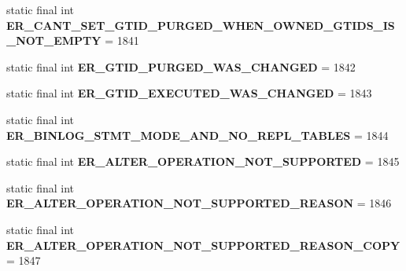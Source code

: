 \begin{DoxyCompactItemize}
static final int {\bfseries E\+R\+\_\+\+C\+A\+N\+T\+\_\+\+S\+E\+T\+\_\+\+G\+T\+I\+D\+\_\+\+P\+U\+R\+G\+E\+D\+\_\+\+W\+H\+E\+N\+\_\+\+O\+W\+N\+E\+D\+\_\+\+G\+T\+I\+D\+S\+\_\+\+I\+S\+\_\+\+N\+O\+T\+\_\+\+E\+M\+P\+TY} = 1841
\item 
\mbox{\label{classcom_1_1mysql_1_1jdbc_1_1_mysql_error_numbers_a2bfc7fcef223745f9eaf66b9d0e5ae52}} 
static final int {\bfseries E\+R\+\_\+\+G\+T\+I\+D\+\_\+\+P\+U\+R\+G\+E\+D\+\_\+\+W\+A\+S\+\_\+\+C\+H\+A\+N\+G\+ED} = 1842
\item 
\mbox{\label{classcom_1_1mysql_1_1jdbc_1_1_mysql_error_numbers_a84cf16acdaceffc21025fd64c349d2f3}} 
static final int {\bfseries E\+R\+\_\+\+G\+T\+I\+D\+\_\+\+E\+X\+E\+C\+U\+T\+E\+D\+\_\+\+W\+A\+S\+\_\+\+C\+H\+A\+N\+G\+ED} = 1843
\item 
\mbox{\label{classcom_1_1mysql_1_1jdbc_1_1_mysql_error_numbers_a7f3026c2abec01c0d70b4cdb81c17c56}} 
static final int {\bfseries E\+R\+\_\+\+B\+I\+N\+L\+O\+G\+\_\+\+S\+T\+M\+T\+\_\+\+M\+O\+D\+E\+\_\+\+A\+N\+D\+\_\+\+N\+O\+\_\+\+R\+E\+P\+L\+\_\+\+T\+A\+B\+L\+ES} = 1844
\item 
\mbox{\label{classcom_1_1mysql_1_1jdbc_1_1_mysql_error_numbers_a0dfd1375973192bf9aec4c7558c037f6}} 
static final int {\bfseries E\+R\+\_\+\+A\+L\+T\+E\+R\+\_\+\+O\+P\+E\+R\+A\+T\+I\+O\+N\+\_\+\+N\+O\+T\+\_\+\+S\+U\+P\+P\+O\+R\+T\+ED} = 1845
\item 
\mbox{\label{classcom_1_1mysql_1_1jdbc_1_1_mysql_error_numbers_aa9fecb934e485789283161ab2d2e16f1}} 
static final int {\bfseries E\+R\+\_\+\+A\+L\+T\+E\+R\+\_\+\+O\+P\+E\+R\+A\+T\+I\+O\+N\+\_\+\+N\+O\+T\+\_\+\+S\+U\+P\+P\+O\+R\+T\+E\+D\+\_\+\+R\+E\+A\+S\+ON} = 1846
\item 
\mbox{\label{classcom_1_1mysql_1_1jdbc_1_1_mysql_error_numbers_a06ed83d39bcc25fe2faeea506d50c728}} 
static final int {\bfseries E\+R\+\_\+\+A\+L\+T\+E\+R\+\_\+\+O\+P\+E\+R\+A\+T\+I\+O\+N\+\_\+\+N\+O\+T\+\_\+\+S\+U\+P\+P\+O\+R\+T\+E\+D\+\_\+\+R\+E\+A\+S\+O\+N\+\_\+\+C\+O\+PY} = 1847
\item 

\end{DoxyCompactItemize}
